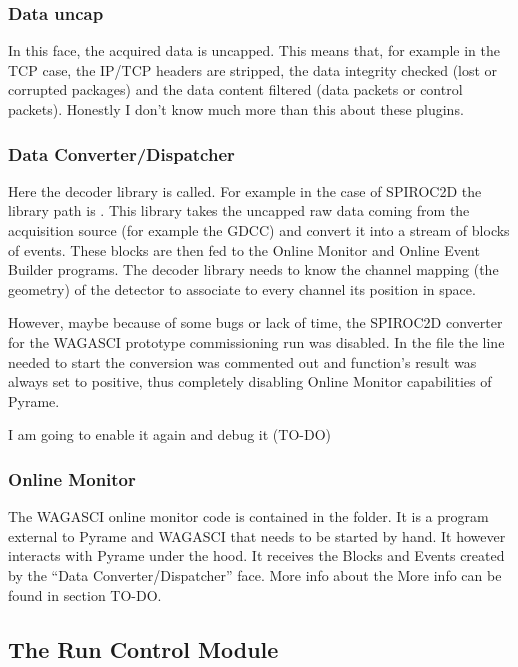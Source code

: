 \subsubsection{Data uncap}
In this face, the acquired data is uncapped. This means that, for
example in the TCP case, the IP/TCP headers are stripped, the data
integrity checked (lost or corrupted packages) and the data content
filtered (data packets or control packets). Honestly I don't know much
more than this about these plugins.

\subsubsection{Data Converter/Dispatcher}
Here the decoder library is called. For example in the case of
SPIROC2D the library path is . This
library takes the uncapped raw data coming from the acquisition source
(for example the GDCC) and convert it into a stream of blocks of
events. These blocks are then fed to the Online Monitor and Online
Event Builder programs.  The decoder library needs to know the channel
mapping (the geometry) of the detector to associate to every channel
its position in space.

However, maybe because of some bugs or lack of time, the SPIROC2D
converter for the WAGASCI prototype commissioning run was disabled. In
the  file the line needed to start the
conversion was commented out and function's result was always set to
positive, thus completely disabling Online Monitor capabilities of
Pyrame.

I am going to enable it again and debug it (TO-DO)

\subsubsection{Online Monitor}
The WAGASCI online monitor code is contained in the
 folder. It is a program external
to Pyrame and WAGASCI that needs to be started by hand. It however
interacts with Pyrame under the hood. It receives the Blocks and
Events created by the ``Data Converter/Dispatcher'' face. More info
about the More info can be found in section TO-DO.

\subsection{The Run Control Module}
\label{sec:RC}


